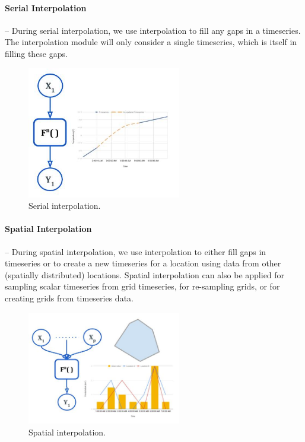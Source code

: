 \paragraph{Serial Interpolation}-- During serial interpolation, we use interpolation to fill any gaps in a timeseries. The interpolation module will only consider a single timeseries, which is itself in filling these gaps.

\begin{figure}[htp]
    \centering
    \includegraphics[width=0.6\textwidth]{method/data_preprocess/serial_interpolation.jpg}
    \caption{Serial interpolation.}
    \label{fi:serial_interpolation}
\end{figure}

\paragraph{Spatial Interpolation}-- During spatial interpolation, we use interpolation to either fill gaps in timeseries or to create a new timeseries for a location using data from other (spatially distributed) locations. Spatial interpolation can also be applied for sampling scalar timeseries from grid timeseries, for re-sampling grids, or for creating grids from timeseries data.
\begin{figure}[htp]
    \centering
    \includegraphics[width=0.6\textwidth]{method/data_preprocess/spatial_interpolation.jpg}
    \caption{Spatial interpolation.}
    \label{fi:spatial_interpolation}
\end{figure}

